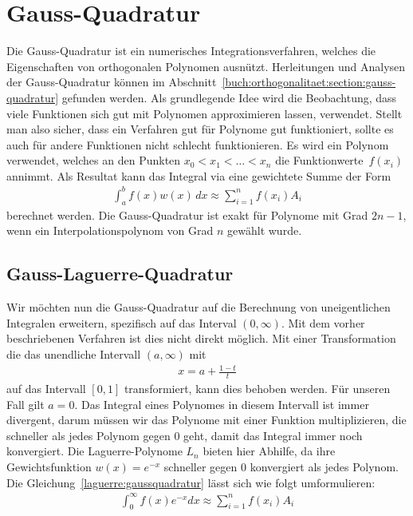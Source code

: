 %
%
%
\section{Gauss-Quadratur
  \label{laguerre:section:quadratur}}
Die Gauss-Quadratur ist ein numerisches Integrationsverfahren,
welches die Eigenschaften von orthogonalen Polynomen ausnützt.
Herleitungen und Analysen der Gauss-Quadratur können im 
Abschnitt~\ref{buch:orthogonalitaet:section:gauss-quadratur} gefunden werden.
Als grundlegende Idee wird die Beobachtung,
dass viele Funktionen sich gut mit Polynomen approximieren lassen,
verwendet.
Stellt man also sicher,
dass ein Verfahren gut für Polynome gut funktioniert, 
sollte es auch für andere Funktionen nicht schlecht funktionieren.
Es wird ein Polynom verwendet, 
welches an den Punkten $x_0 < x_1 < \ldots < x_n$ 
die Funktionwerte~$f(x_i)$ annimmt.
Als Resultat kann das Integral via eine gewichtete Summe der Form
\begin{align}
\int_a^b f(x) w(x) \, dx
\approx
\sum_{i=1}^n f(x_i) A_i
\label{laguerre:gaussquadratur}
\end{align}
berechnet werden.
Die Gauss-Quadratur ist exakt für Polynome mit Grad $2n -1$,
wenn ein Interpolationspolynom von Grad $n$ gewählt wurde.

\subsection{Gauss-Laguerre-Quadratur
\label{laguerre:subsection:gausslag-quadratur}}
Wir möchten nun die Gauss-Quadratur auf die Berechnung
von uneigentlichen Integralen erweitern,
spezifisch auf das Interval $(0, \infty)$.
Mit dem vorher beschriebenen Verfahren ist dies nicht direkt möglich.
Mit einer Transformation die das unendliche Intervall $(a, \infty)$ mit
\begin{align*}
x
=
a + \frac{1 - t}{t}
\end{align*}
auf das Intervall $[0, 1]$ transformiert,
kann dies behoben werden.
Für unseren Fall gilt $a = 0$.
Das Integral eines Polynomes in diesem Intervall ist immer divergent,
darum müssen wir das Polynome mit einer Funktion multiplizieren,
die schneller als jedes Polynom gegen $0$ geht,
damit das Integral immer noch konvergiert.
Die Laguerre-Polynome $L_n$ bieten hier Abhilfe,
da ihre Gewichtsfunktion $w(x) = e^{-x}$ schneller
gegen $0$ konvergiert als jedes Polynom.
Die Gleichung~\eqref{laguerre:gaussquadratur} lässt sich wie folgt
umformulieren:
\begin{align}
\int_{0}^{\infty} f(x) e^{-x} dx
\approx
\sum_{i=1}^{n} f(x_i) A_i
\label{laguerre:laguerrequadratur}
\end{align}

